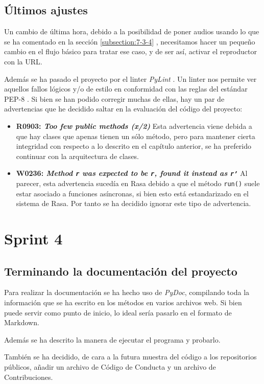 \subsection{Últimos ajustes}

Un cambio de última hora, debido a la posibilidad de poner audios usando lo que se ha comentado en la sección \ref{subsection:7-3-4} , necesitamos hacer un pequeño cambio en el flujo básico para tratar ese caso, y de ser así,  activar el reproductor con la URL.

Además se ha pasado el proyecto por el linter \textit{PyLint} \cite{pylint}. Un linter nos permite ver aquellos fallos lógicos y/o de estilo en conformidad con las reglas del estándar PEP-8 \cite{pep8}. Si bien se han podido corregir muchas de ellas, hay un par de advertencias que he decidido saltar en la evaluación del código del proyecto:
\begin{itemize}
	\item \textbf{R0903: \textit{Too few public methods (x/2)}} Esta advertencia viene debida a que hay clases que apenas tienen un sólo método, pero para mantener cierta integridad con respecto a lo descrito en el capítulo anterior, se ha preferido continuar con la arquitectura de clases.
	\item \textbf{W0236: \textit{Method \texttt{r} was expected to be \texttt{r}, found it instead as \texttt{r'}}} Al parecer, esta advertencia sucedía en Rasa debido a que el método \texttt{run()} suele estar asociado a funciones asíncronas, si bien esto está estandarizado en el sistema de Rasa. Por tanto se ha decidido ignorar este tipo de advertencia.
\end{itemize}

\section{Sprint 4}
\subsection{Terminando la documentación del proyecto}
Para realizar la documentación se ha hecho uso de \textit{PyDoc}, compilando toda la información que se ha escrito en los métodos en varios archivos web. Si bien puede servir como punto de inicio, lo ideal sería pasarlo en el formato de Markdown.

Además se ha descrito la manera de ejecutar el programa y probarlo.

También se ha decidido, de cara a la futura muestra del código a los repositorios públicos, añadir un archivo de Código de Conducta y un archivo de Contribuciones.

